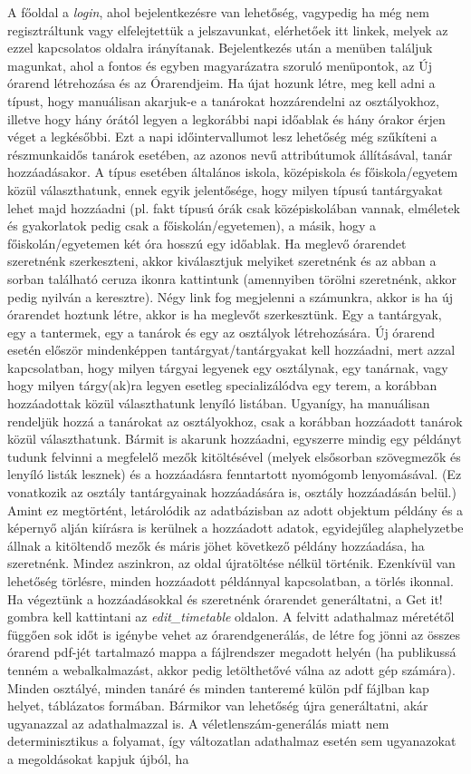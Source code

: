 A főoldal a \textit{login}, ahol bejelentkezésre van lehetőség, vagypedig ha még nem regisztráltunk vagy elfelejtettük a jelszavunkat, elérhetőek itt linkek, melyek az ezzel kapcsolatos oldalra irányítanak. Bejelentkezés után a menüben találjuk magunkat, ahol a fontos és egyben magyarázatra szoruló menüpontok, az Új órarend létrehozása és az Órarendjeim. Ha újat hozunk létre, meg kell adni a típust, hogy manuálisan akarjuk-e a tanárokat hozzárendelni az osztályokhoz, illetve hogy hány órától legyen a legkorábbi napi időablak és hány órakor érjen véget a legkésőbbi. Ezt a napi időintervallumot lesz lehetőség még szűkíteni a részmunkaidős tanárok esetében, az azonos nevű attribútumok állításával, tanár hozzáadásakor. A típus esetében általános iskola, középiskola és főiskola/egyetem közül választhatunk, ennek egyik jelentősége, hogy milyen típusú tantárgyakat lehet majd hozzáadni (pl. fakt típusú órák csak középiskolában vannak, elméletek és gyakorlatok pedig csak a főiskolán/egyetemen), a másik, hogy a főiskolán/egyetemen két óra hosszú egy időablak. Ha meglevő órarendet szeretnénk szerkeszteni, akkor kiválasztjuk melyiket szeretnénk és az abban a sorban található ceruza ikonra kattintunk (amennyiben törölni szeretnénk, akkor pedig nyilván a keresztre). Négy link fog megjelenni a számunkra, akkor is ha új órarendet hoztunk létre, akkor is ha meglevőt szerkesztünk. Egy a tantárgyak, egy a tantermek, egy a tanárok és egy az osztályok létrehozására. Új órarend esetén először mindenképpen tantárgyat/tantárgyakat kell hozzáadni, mert azzal kapcsolatban, hogy milyen tárgyai legyenek egy osztálynak, egy tanárnak, vagy hogy milyen tárgy(ak)ra legyen esetleg specializálódva egy terem, a korábban hozzáadottak közül választhatunk lenyíló listában. Ugyanígy, ha manuálisan rendeljük hozzá a tanárokat az osztályokhoz, csak a korábban hozzáadott tanárok közül választhatunk. Bármit is akarunk hozzáadni, egyszerre mindig egy példányt tudunk felvinni a megfelelő mezők kitöltésével (melyek elsősorban szövegmezők és lenyíló listák lesznek) és a hozzáadásra fenntartott nyomógomb lenyomásával. (Ez vonatkozik az osztály tantárgyainak hozzáadására is, osztály hozzáadásán belül.) Amint ez megtörtént, letárolódik az adatbázisban az adott objektum példány és a képernyő alján kiírásra is kerülnek a hozzáadott adatok, egyidejűleg alaphelyzetbe állnak a kitöltendő mezők és máris jöhet következő példány hozzáadása, ha szeretnénk. Mindez aszinkron, az oldal újratöltése nélkül történik. Ezenkívül van lehetőség törlésre, minden hozzáadott példánnyal kapcsolatban, a törlés ikonnal. Ha végeztünk a hozzáadásokkal és szeretnénk órarendet generáltatni, a Get it! gombra kell kattintani az \textit{edit\_timetable} oldalon. A felvitt adathalmaz méretétől függően sok időt is igénybe vehet az órarendgenerálás, de létre fog jönni az összes órarend pdf-jét tartalmazó mappa a fájlrendszer megadott helyén (ha publikussá tenném a webalkalmazást, akkor pedig letölthetővé válna az adott gép számára). Minden osztályé, minden tanáré és minden tanteremé külön pdf fájlban kap helyet, táblázatos formában. Bármikor van lehetőség újra generáltatni, akár ugyanazzal az adathalmazzal is. A véletlenszám-generálás miatt nem determinisztikus a folyamat, így változatlan adathalmaz esetén sem ugyanazokat a megoldásokat kapjuk újból, ha 